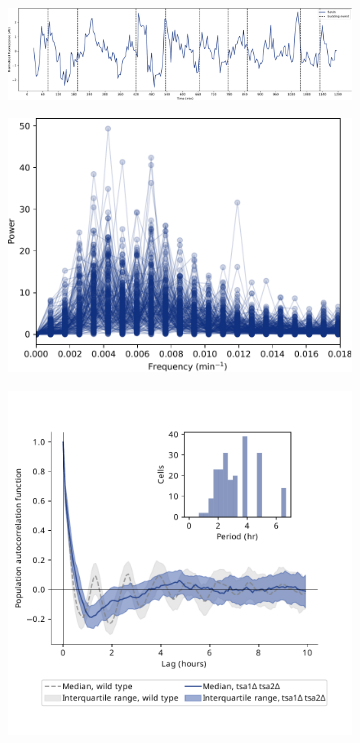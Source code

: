 \begin{figure}
  \centering
  \begin{subfigure}[t]{1.0\textwidth}
   \centering
   \includegraphics[width=\textwidth]{1649_tsa1tsa2morgan_018-14-1_edit.pdf}
   \caption{
   }
   \label{fig:biology-tsa1tsa2-single}
  \end{subfigure}

  \begin{subfigure}[t]{0.45\textwidth}
   \centering
   \includegraphics[width=\textwidth]{tsa1tsa2morgan_1649_fftrep_freq_edit.pdf}
   \caption{
   }
   \label{fig:biology-tsa1tsa2-fourier}
  \end{subfigure}%
  \begin{subfigure}[t]{0.45\textwidth}
   \centering
   \includegraphics[width=\textwidth]{tsa1tsa2morgan_1649_12.pdf}

\end{subfigure}
\end{figure}
